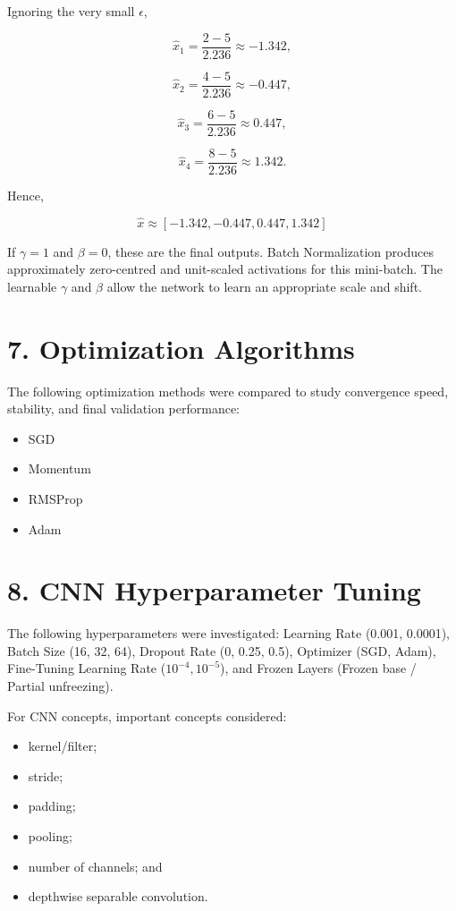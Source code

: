 \documentclass[10pt]{article}
\begin{document}
Ignoring the very small $\epsilon$,

\[
\hat{x}_1=\frac{2-5}{2.236}\approx-1.342,
\]

\[
\hat{x}_2=\frac{4-5}{2.236}\approx-0.447,
\]

\[
\hat{x}_3=\frac{6-5}{2.236}\approx0.447,
\]

\[
\hat{x}_4=\frac{8-5}{2.236}\approx1.342.
\]

Hence,

\[
\boxed{
\hat{x}\approx[-1.342,-0.447,0.447,1.342]
}
\]

If $\gamma=1$ and $\beta=0$, these are the final outputs. Batch Normalization produces approximately
zero-centred and unit-scaled activations for this mini-batch. The
learnable $\gamma$ and $\beta$ allow the network to learn an appropriate
scale and shift.

\section*{7. Optimization Algorithms}

The following optimization methods were compared to study convergence speed, stability, and final validation performance:

\begin{itemize}
\item SGD
\item Momentum
\item RMSProp
\item Adam
\end{itemize}

\section*{8. CNN Hyperparameter Tuning}

The following hyperparameters were investigated:
Learning Rate (0.001, 0.0001), Batch Size (16, 32, 64), Dropout Rate (0, 0.25, 0.5), Optimizer (SGD, Adam), Fine-Tuning Learning Rate ($10^{-4}, 10^{-5}$), and Frozen Layers (Frozen base / Partial unfreezing).

For CNN concepts, important concepts considered:

\begin{itemize}
\item kernel/filter;
\item stride;
\item padding;
\item pooling;
\item number of channels; and
\item depthwise separable convolution.
\end{itemize}
\end{document}
